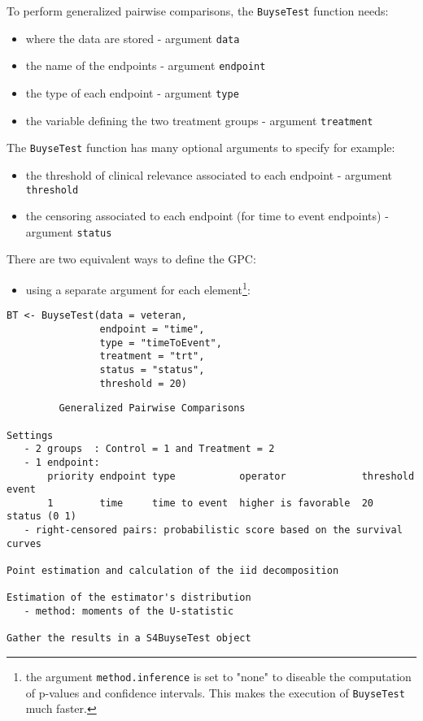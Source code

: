 \documentclass[12pt]{article}
\begin{document}
To perform generalized pairwise comparisons, the \texttt{BuyseTest} function needs:
\begin{itemize}
\item where the data are stored \hfill - argument \texttt{data}
\item the name of the endpoints \hfill - argument \texttt{endpoint}
\item the type of each endpoint \hfill - argument \texttt{type}
\item the variable defining the two treatment groups \hfill - argument
\texttt{treatment}
\end{itemize}
The \texttt{BuyseTest} function has many optional arguments to specify for example:
\begin{itemize}
\item the threshold of clinical relevance associated to each endpoint \hfill - argument \texttt{threshold}
\item the censoring associated to each endpoint (for time to event endpoints) \hfill - argument \texttt{status}
\end{itemize}

\bigskip

There are two equivalent ways to define the GPC: 
\begin{itemize}
\item using a separate argument for each element\footnote{the argument
\texttt{method.inference} is set to "none" to diseable the computation of
p-values and confidence intervals. This makes the execution of
\texttt{BuyseTest} much faster.}:
\end{itemize}

\lstset{language=r,label= ,caption= ,captionpos=b,numbers=none}
\begin{lstlisting}
BT <- BuyseTest(data = veteran, 
				endpoint = "time", 
				type = "timeToEvent", 
				treatment = "trt", 
				status = "status", 
				threshold = 20)
\end{lstlisting}

\begin{verbatim}
         Generalized Pairwise Comparisons

Settings 
   - 2 groups  : Control = 1 and Treatment = 2
   - 1 endpoint: 
       priority endpoint type           operator             threshold event       
       1        time     time to event  higher is favorable  20        status (0 1)
   - right-censored pairs: probabilistic score based on the survival curves 

Point estimation and calculation of the iid decomposition

Estimation of the estimator's distribution 
   - method: moments of the U-statistic

Gather the results in a S4BuyseTest object
\end{verbatim}
\end{document}
